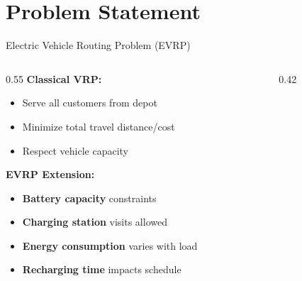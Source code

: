 \documentclass[aspectratio=169,11pt]{beamer}
\newcommand{\highlight}[1]{\textcolor{accentgreen}{\textbf{#1}}}
\begin{document}
\section{Problem Statement}

\begin{frame}{Electric Vehicle Routing Problem (EVRP)}
    \begin{columns}[T]
        \begin{column}{0.55\textwidth}
            \textbf{Classical VRP:}
            \begin{itemize}
                \item Serve all customers from depot
                \item Minimize total travel distance/cost
                \item Respect vehicle capacity
            \end{itemize}
            
            \vspace{0.3cm}
            \textbf{EVRP Extension:}
            \begin{itemize}
                \item \highlight{Battery capacity} constraints
                \item \highlight{Charging station} visits allowed
                \item \highlight{Energy consumption} varies with load
                \item \highlight{Recharging time} impacts schedule
            \end{itemize}
        \end{column}
        \begin{column}{0.42\textwidth}
            \begin{center}
\end{center}
\end{column}
\end{columns}
\end{frame}
\end{document}

